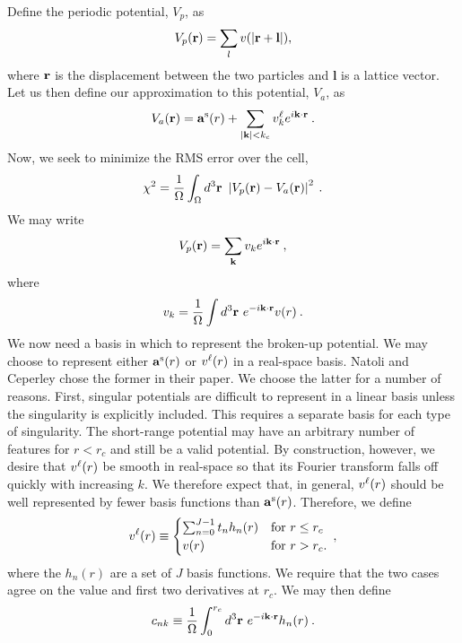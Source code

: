 Define the periodic potential, $V_p$, as 
\begin{equation}
V_p(\vr) = \sum_l v(|\vr + \mathbf{l}|),
\end{equation}
where $\vr$ is the displacement between the two particles and
$\mathbf{l}$ is a lattice vector.  Let us then define our
approximation to this potential, $V_a$, as
\begin{equation}
V_a(\vr) = \vs(r) + \sum_{|\vk| < k_c} \vl_k e^{i\mathbf \vk \cdot \vr}\:.
\end{equation}
Now, we seek to minimize the RMS error over the cell,
\begin{equation}
\chi^2 = \frac{1}{\Omega}\int_\Omega d^3 \mathbf{r} \ 
\left| V_p(\vr) - V_a(\vr)\right|^2\:. 
\end{equation}
We may write
\begin{equation}
V_p(\vr) = \sum_{\vk} v_k e^{i \vk \cdot \vr}\:,
\end{equation}
where 
\begin{equation}
v_k = \frac{1}{\Omega} \int d^3\vr \ e^{-i\vk\cdot\vr}v(r)\:.
\end{equation}
We now need a basis in which to represent the broken-up potential.  We
may choose to represent either $\vs(r)$ or $\vl(r)$ in a real-space
basis.  Natoli and Ceperley chose the former in their paper.  We choose
the latter for a number of reasons.  First, singular potentials are
difficult to represent in a linear basis unless the singularity is
explicitly included.  This requires a separate basis for each type of
singularity.  The short-range potential may have an arbitrary number
of features for $r<r_c$ and still be a valid potential.  By
construction, however, we desire that $\vl(r)$ be smooth in real-space
so that its Fourier transform falls off quickly with increasing $k$.
We therefore expect that, in general, $\vl(r)$ should be
well represented by fewer basis functions than $\vs(r)$.  Therefore,
we define
\begin{equation}
\vl(r) \equiv
\begin{cases}
 \sum_{n=0}^{J-1} t_n h_n(r) & \text{for } r \le r_c \\
 v(r) & \text{for } r > r_c.
\end{cases}\:,
\end{equation}
where the $h_n(r)$ are a set of $J$ basis functions.  We require that
the two cases agree on the value and first two derivatives at $r_c$.
We may then define
\begin{equation}
c_{nk} \equiv \frac{1}{\Omega} \int_0^{r_c} d^3 \vr \ e^{-i\vk\cdot\vr} h_n(r)\:.
\end{equation}
